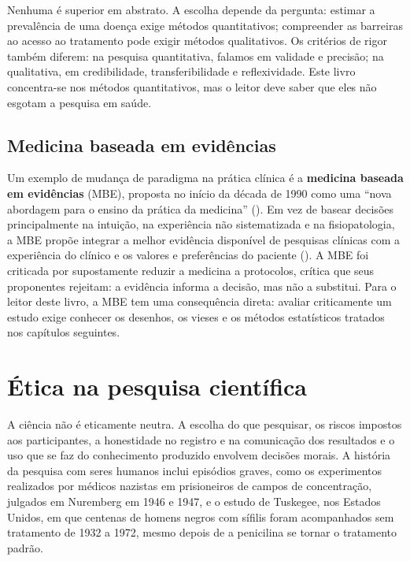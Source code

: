 \documentclass[
]{book}
\begin{document}
Nenhuma é superior em abstrato. A escolha depende da pergunta: estimar a prevalência de uma doença exige métodos quantitativos; compreender as barreiras ao acesso ao tratamento pode exigir métodos qualitativos. Os critérios de rigor também diferem: na pesquisa quantitativa, falamos em validade e precisão; na qualitativa, em credibilidade, transferibilidade e reflexividade. Este livro concentra-se nos métodos quantitativos, mas o leitor deve saber que eles não esgotam a pesquisa em saúde.

\subsection{Medicina baseada em evidências}\label{medicina-baseada-em-eviduxeancias}

Um exemplo de mudança de paradigma na prática clínica é a \textbf{medicina baseada em evidências} (MBE), proposta no início da década de 1990 como uma ``nova abordagem para o ensino da prática da medicina'' (). Em vez de basear decisões principalmente na intuição, na experiência não sistematizada e na fisiopatologia, a MBE propõe integrar a melhor evidência disponível de pesquisas clínicas com a experiência do clínico e os valores e preferências do paciente (). A MBE foi criticada por supostamente reduzir a medicina a protocolos, crítica que seus proponentes rejeitam: a evidência informa a decisão, mas não a substitui. Para o leitor deste livro, a MBE tem uma consequência direta: avaliar criticamente um estudo exige conhecer os desenhos, os vieses e os métodos estatísticos tratados nos capítulos seguintes.

\section{Ética na pesquisa científica}\label{uxe9tica-na-pesquisa-cientuxedfica}

A ciência não é eticamente neutra. A escolha do que pesquisar, os riscos impostos aos participantes, a honestidade no registro e na comunicação dos resultados e o uso que se faz do conhecimento produzido envolvem decisões morais. A história da pesquisa com seres humanos inclui episódios graves, como os experimentos realizados por médicos nazistas em prisioneiros de campos de concentração, julgados em Nuremberg em 1946 e 1947, e o estudo de Tuskegee, nos Estados Unidos, em que centenas de homens negros com sífilis foram acompanhados sem tratamento de 1932 a 1972, mesmo depois de a penicilina se tornar o tratamento padrão.
\end{document}
